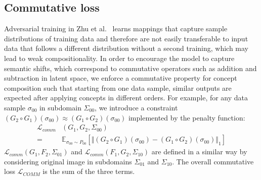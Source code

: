 \documentclass[10pt,twocolumn,letterpaper]{article}
\begin{document}

\subsection{Commutative loss}
Adversarial training in Zhu et al.~\cite{CycleGAN} learns mappings that capture sample distributions of training data and therefore are not easily transferable to input data that follows a different distribution without a second training, which may lead to weak compositionality. In order to encourage the model to capture semantic shifts, which correspond to commutative operators such as addition and subtraction in latent space, we enforce a commutative property for concept composition such that starting from one data sample, similar outputs are expected after applying concepts in different orders. For example, for any data sample $\sigma_{00}$ in subdomain $\Sigma_{00}$, we introduce a constraint $(G_2\circ G_1)(\sigma_{00})\approx (G_1\circ G_2)(\sigma_{00})$ implemented by the penalty function:
\begin{align}
\mathcal{L}_{comm}&(G_1,G_2,\Sigma_{00}) \nonumber \\
=&\mathbb{E}_{\sigma_{00}\sim P_{00}}[\Vert (G_2\circ G_1)(\sigma_{00})-(G_1\circ G_2)(\sigma_{00})\Vert_1]
\end{align} $\mathcal{L}_{comm}(G_1,F_2,\Sigma_{01})$ and $\mathcal{L}_{comm}(F_1,G_2,\Sigma_{10})$ are defined in a similar way by considering original image in subdomains $\Sigma_{01}$ and $\Sigma_{10}$. The overall commutative loss $\mathcal{L}_{COMM}$ is the sum of the three terms.

\end{document}
